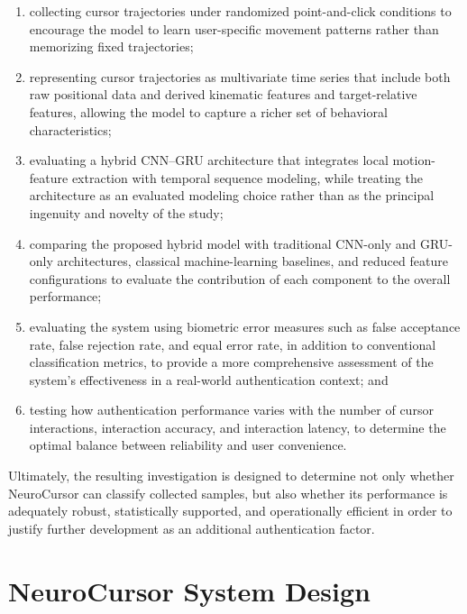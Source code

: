 \documentclass[conference]{IEEEtran}
\begin{document}
\begin{enumerate}
    \item collecting cursor trajectories under randomized point-and-click conditions to encourage the model to learn user-specific movement patterns rather than memorizing fixed trajectories;
    
    \item representing cursor trajectories as multivariate time series that include both raw positional data and derived kinematic features and target-relative features, allowing the model to capture a richer set of behavioral characteristics;
    
    \item evaluating a hybrid CNN--GRU architecture that integrates local motion-feature extraction with temporal sequence modeling, while treating the architecture as an evaluated modeling choice rather than as the principal ingenuity and novelty of the study;
    
    \item comparing the proposed hybrid model with traditional CNN-only and GRU-only architectures, classical machine-learning baselines, and reduced feature configurations to evaluate the contribution of each component to the overall performance;
    
    \item evaluating the system using biometric error measures such as false acceptance rate, false rejection rate, and equal error rate, in addition to conventional classification metrics, to provide a more comprehensive assessment of the system's effectiveness in a real-world authentication context; and
    
    \item testing how authentication performance varies with the number of cursor interactions, interaction accuracy, and interaction latency, to determine the optimal balance between reliability and user convenience.
\end{enumerate}

Ultimately, the resulting investigation is designed to determine not only whether NeuroCursor can classify collected samples, but also whether its performance is adequately robust, statistically supported, and operationally efficient in order to justify further development as an additional authentication factor. 

\section{NeuroCursor System Design}
\end{document}
